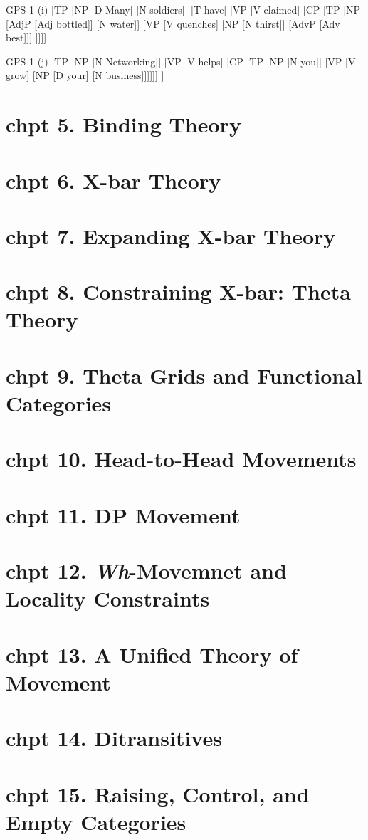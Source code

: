 \documentclass{article}
\begin{document}
\bigskip
\noindent
\begin{gpstree}{GPS 1-(i)}
[TP
  [NP [D Many] [N soldiers]]
  [T have]
  [VP [V claimed] [CP [TP 
    [NP [AdjP [Adj bottled]] [N water]]
    [VP [V quenches] [NP [N thirst]] [AdvP [Adv best]]]
]]]]
\end{gpstree}  
\hfill
\noindent
\begin{gpstree}{GPS 1-(j)}
[TP
  [NP [N Networking]]
  [VP [V helps] [CP [TP [NP [N you]] [VP [V grow] [NP [D your] [N business]]]]]]
]
\end{gpstree}  

\newpage
\section{chpt 5. Binding Theory}

\section{chpt 6. X-bar Theory}

\section{chpt 7. Expanding X-bar Theory}

\section{chpt 8. Constraining X-bar: Theta Theory}

\section{chpt 9. Theta Grids and Functional Categories}

\section{chpt 10. Head-to-Head Movements}

\section{chpt 11. DP Movement}

\section{chpt 12. \textit{Wh}-Movemnet and Locality Constraints}

\section{chpt 13. A Unified Theory of Movement}

\section{chpt 14. Ditransitives}

\section{chpt 15. Raising, Control, and Empty Categories}
\end{document}
